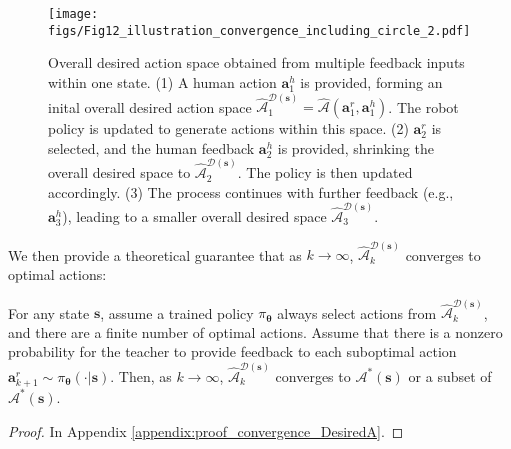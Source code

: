 \begin{figure}[t!]
	\centering
	\texttt{[image: figs/Fig12\_illustration\_convergence\_including\_circle\_2.pdf]}
    \vspace*{-5mm}
	\caption{
 Overall desired action space obtained from multiple feedback inputs within one state. (1) A human action $\bm a^h_1$ is provided, forming an inital overall desired action space $\hat{ \mathcal{A}}^{\mathcal{D}(\bm s)}_1 = \hat{\mathcal{A}}{(\bm a^r_1, \bm a^h_1)} $. The robot policy is updated to generate actions within this space. 
 (2) $\bm a^r_2$ is selected, and the human feedback $\bm a^h_2$ is provided, shrinking the overall desired space to $\hat{ \mathcal{A}}^{\mathcal{D}(\bm s)}_2$.
The policy is then updated accordingly.
 (3) The process continues with further feedback (e.g., $\bm a^h_3$), leading to a smaller overall desired space $\hat{ \mathcal{A}}^{\mathcal{D}(\bm s)}_3$.  }
\label{fig:Fig12_illustration_convergence_including_circle_2}
\end{figure}
We then provide a theoretical guarantee that as $k\rightarrow \infty$, $\hat{ \mathcal{A}}^{\mathcal{D}(\bm s)}_k$ converges to optimal actions: 

\begin{proposition}
   For any state $\bm s$, assume a trained policy $\pi_{\bm \theta}$ always select actions from $\hat{\mathcal{A}}^{\mathcal{D}(\bm s)}_k$,
   and there are a finite number of optimal actions.
   Assume that there is a nonzero probability for the teacher to provide feedback to each suboptimal action $\bm a^r_{k+1} \sim \pi_{\bm \theta}(\cdot | \bm s)$. 
    Then, as $k \rightarrow \infty$, $\hat{\mathcal{A}}^{\mathcal{D}(\bm s)}_k$ converges to $\mathcal{A}^*(\bm s)$ or a subset of $\mathcal{A}^*(\bm s)$.
   \label{proposition:convergence}
\end{proposition}
\begin{proof}
    In Appendix \ref{appendix:proof_convergence_DesiredA}.
\end{proof}


